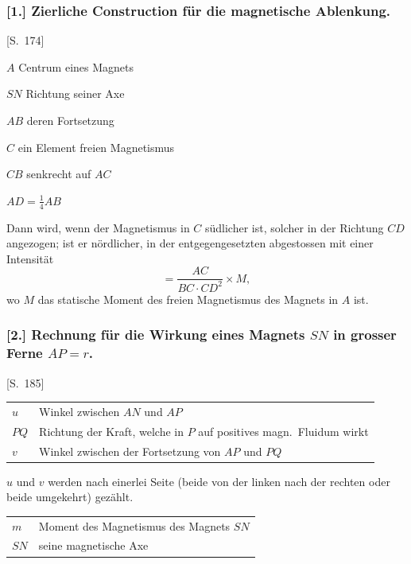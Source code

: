 \documentclass[12pt,a4paper]{article}
\begin{document}
\subsubsection*{[1.] Zierliche Construction f\"ur die magnetische Ablenkung.}

[S.~174]

\begin{center}
$A$ Centrum eines Magnets

$SN$ Richtung seiner Axe

$AB$ deren Fortsetzung

$C$ ein Element freien Magnetismus

$CB$ senkrecht auf $AC$

$AD = \tfrac14 AB$
\end{center}

Dann wird, wenn der Magnetismus in $C$ s\"udlicher ist, solcher in der Richtung $CD$ angezogen; ist er n\"ordlicher, in der entgegengesetzten abgestossen mit einer Intensit\"at
\[=
\frac{AC}{BC \cdot CD^2} \times M,
\]
wo $M$ das statische Moment des freien Magnetismus des Magnets in $A$ ist.

\subsubsection*{[2.] Rechnung f\"ur die Wirkung eines Magnets $SN$ in grosser Ferne $AP = r$.}

[S.~185]

\begin{center}
\begin{tabular}{ll}
$u$ & Winkel zwischen $AN$ und $AP$ \\
$PQ$ & Richtung der Kraft, welche in $P$ auf positives magn.~Fluidum wirkt \\
$v$ & Winkel zwischen der Fortsetzung von $AP$ und $PQ$
\end{tabular}
\end{center}

$u$ und $v$ werden nach einerlei Seite (beide von der linken nach der rechten oder beide umgekehrt) gez\"ahlt.

\begin{center}
\begin{tabular}{ll}
$m$ & Moment des Magnetismus des Magnets $SN$ \\
$SN$ & seine magnetische Axe
\end{tabular}
\end{center}
\end{document}
